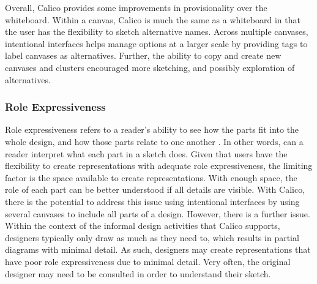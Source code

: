%
 
Overall, Calico provides some improvements in provisionality over the whiteboard. Within a canvas, Calico is much the same as a whiteboard in that the user has the flexibility to sketch alternative names. Across multiple canvases, intentional interfaces helps manage options at a larger scale by providing tags to label canvases as alternatives. Further, the ability to copy and create new canvases and clusters encouraged more sketching, and possibly exploration of alternatives.


\subsubsection{Role Expressiveness}

Role expressiveness refers to a reader's ability to see how the parts fit into the whole design, and how those parts relate to one another \cite{Petre2013BookChapter}. In other words, can a reader interpret what each part in a sketch does. Given that users have the flexibility to create representations with adequate role expressiveness, the limiting factor is the space available to create representations. With enough space, the role of each part can be better understood if all details are visible. With Calico, there is the potential to address this issue using intentional interfaces by using several canvases to include all parts of a design. However, there is a further issue. Within the context of the informal design activities that Calico supports, designers typically only draw as much as they need to, which results in partial diagrams with minimal detail. As such, designers may create representations that have poor role expressiveness due to minimal detail. Very often, the original designer may need to be consulted in order to understand their sketch.

